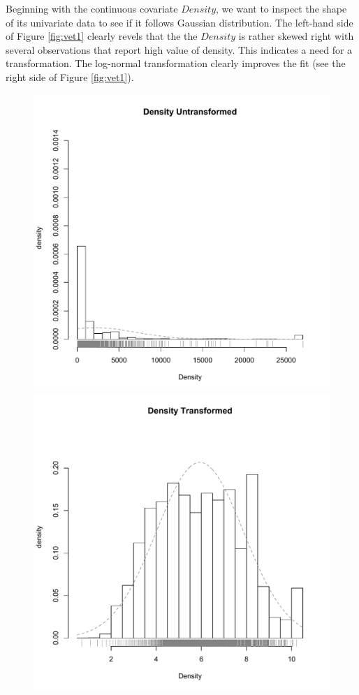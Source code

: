 \documentclass[11pt,letterpaper]{article}
\numberwithin{equation}{section}
\numberwithin{equation}{section}
\numberwithin{equation}{section}
\begin{document}
Beginning with the continuous covariate $Density$, we want to inspect the shape of its univariate data to see if it follows Gaussian distribution. %
The left-hand side of Figure \ref{fig:vet1} clearly revels that the the $Density$ is rather skewed right with several observations that report high value of density. This indicates a need for a transformation. The log-normal transformation clearly improves the fit (see the right side of Figure \ref{fig:vet1}).
\begin{figure}[!htb]
\begin{center}
\includegraphics[scale=0.40]{Density.pdf}
\includegraphics[scale=0.40]{logDensity.pdf}

\end{center}
\end{figure}
\end{document}
